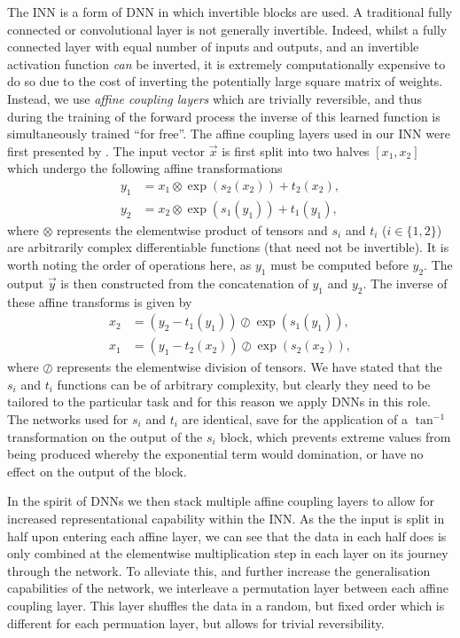 The INN is a form of DNN in which invertible blocks are used.
A traditional fully connected or convolutional layer is not generally invertible.
Indeed, whilst a fully connected layer with equal number of inputs and outputs, and an invertible activation function \emph{can} be inverted, it is extremely computationally expensive to do so due to the cost of inverting the potentially large square matrix of weights.
Instead, we use \emph{affine coupling layers} \citep{2014Dinh,2016Dinh} which are trivially reversible, and thus during the training of the forward process the inverse of this learned function is simultaneously trained ``for free''.
The affine coupling layers used in our INN were first presented by \citet{2018Ardizzone}.
The input vector $\vec{x}$ is first split into two halves $[x_1, x_2]$ which undergo the following affine transformations
\begin{align}
    y_1 &= x_1 \otimes \exp(s_2(x_2)) + t_2(x_2),\\
    y_2 &= x_2 \otimes \exp(s_1(y_1)) + t_1(y_1),
\end{align}
where $\otimes$ represents the elementwise product of tensors and $s_i$ and $t_i$ ($i \in \{1, 2\}$) are arbitrarily complex differentiable functions (that need not be invertible).
It is worth noting the order of operations here, as $y_1$ must be computed before $y_2$.
The output $\vec{y}$ is then constructed from the concatenation of $y_1$ and $y_2$.
The inverse of these affine transforms is given by
\begin{align}
    x_2 &= (y_2 - t_1(y_1)) \oslash \exp(s_1(y_1)),\\
    x_1 &= (y_1 - t_2(x_2)) \oslash \exp(s_2(x_2)),
\end{align}
where $\oslash$ represents the elementwise division of tensors.
We have stated that the $s_i$ and $t_i$ functions can be of arbitrary complexity, but clearly they need to be tailored to the particular task and for this reason we apply DNNs in this role.
The networks used for $s_i$ and $t_i$ are identical, save for the application of a $\tan^{-1}$ transformation on the output of the $s_i$ block, which prevents extreme values from being produced whereby the exponential term would domination, or have no effect on the output of the block.

In the spirit of DNNs we then stack multiple affine coupling layers to allow for increased representational capability within the INN.
As the the input is split in half upon entering each affine layer, we can see that the data in each half does is only combined at the elementwise multiplication step in each layer on its journey through the network.
To alleviate this, and further increase the generalisation capabilities of the network, we interleave a permutation layer between each affine coupling layer.
This layer shuffles the data in a random, but fixed order which is different for each permuation layer, but allows for trivial reversibility.

